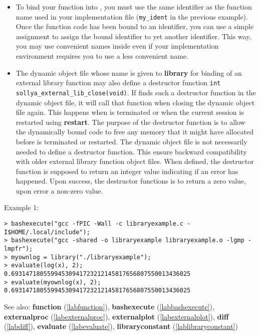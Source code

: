 \begin{itemize}
\item To bind your function into \sollya, you must use the same identifier as the
   function name used in your implementation file (\verb|my_ident| in the previous
   example). Once the function code has been bound to an identifier, you can use a simple assignment
   to assign the bound identifier to yet another identifier. This way, you may use convenient
   names inside \sollya even if your implementation environment requires you to use a less
   convenient name.

\item The dynamic object file whose name is given to \textbf{library} for binding of an
   external library function may also define a destructor function \verb|int sollya_external_lib_close(void)|.
   If \sollya finds such a destructor function in the dynamic object file, it will call 
   that function when closing the dynamic object file again. This happens when \sollya
   is terminated or when the current \sollya session is restarted using \textbf{restart}.
   The purpose of the destructor function is to allow the dynamically bound code
   to free any memory that it might have allocated before \sollya is terminated 
   or restarted. 
   The dynamic object file is not necessarily needed to define a destructor
   function. This ensure backward compatibility with older \sollya external 
   library function object files.
   When defined, the destructor function is supposed to return an integer
   value indicating if an error has happened. Upon success, the destructor
   functions is to return a zero value, upon error a non-zero value.
\end{itemize}
\noindent Example 1: 
\begin{center}\begin{minipage}{15cm}\begin{Verbatim}[frame=single]
> bashexecute("gcc -fPIC -Wall -c libraryexample.c -I$HOME/.local/include");
> bashexecute("gcc -shared -o libraryexample libraryexample.o -lgmp -lmpfr");
> myownlog = library("./libraryexample");
> evaluate(log(x), 2);
0.69314718055994530941723212145817656807550013436025
> evaluate(myownlog(x), 2);
0.69314718055994530941723212145817656807550013436025
\end{Verbatim}
\end{minipage}\end{center}
See also: \textbf{function} (\ref{labfunction}), \textbf{bashexecute} (\ref{labbashexecute}), \textbf{externalproc} (\ref{labexternalproc}), \textbf{externalplot} (\ref{labexternalplot}), \textbf{diff} (\ref{labdiff}), \textbf{evaluate} (\ref{labevaluate}), \textbf{libraryconstant} (\ref{lablibraryconstant})
